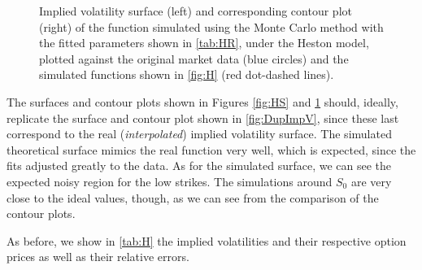 \vfill
\newpage

\begin{figure}[H]
  \begin{subfigmatrix}{2}
  \end{subfigmatrix}
    \caption[Implied volatility surface and corresponding contour plot of the function simulated using the Monte Carlo method with the fitted parameters shown in \autoref{tab:HR}, under the Heston model, plotted against the original market data and the simulated functions shown in \autoref{fig:H}.]{Implied volatility surface (left) and corresponding contour plot (right) of the function simulated using the Monte Carlo method with the fitted parameters shown in \autoref{tab:HR}, under the Heston model, plotted against the original market data (blue circles) and the simulated functions shown in \autoref{fig:H} (red dot-dashed lines).}\label{fig:HSSim}
\end{figure} 


The surfaces and contour plots shown in Figures \ref{fig:HS} and \ref{fig:HSSim} should, ideally, replicate the surface and contour plot shown in \autoref{fig:DupImpV}, since these last correspond to the real (\emph{interpolated}) implied volatility surface. The simulated theoretical surface mimics the real function very well, which is expected, since the fits adjusted greatly to the data.
As for the simulated surface, we can see the expected noisy region for the low strikes. The simulations around $S_0$ are very close to the ideal values, though, as we can see from the comparison of the contour plots.

\vfill
\newpage

As before, we show in \autoref{tab:H} the implied volatilities and their respective option prices as well as their relative errors.

